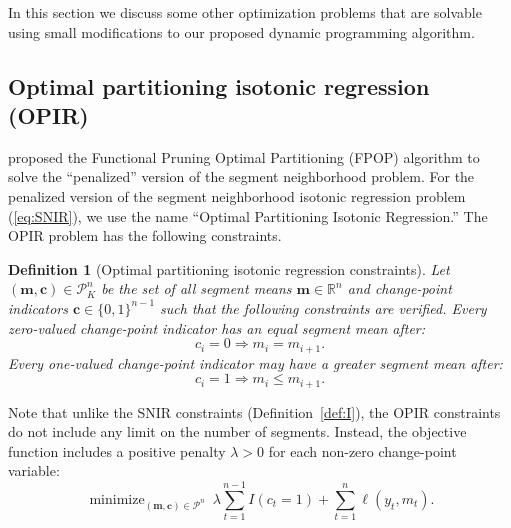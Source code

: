 \documentclass{article}
\newtheorem{definition}{Definition}
\DeclareMathOperator*{\minimize}{minimize}
\newcommand{\RR}{\mathbb R}
\begin{document}
In this section we discuss some other optimization problems that are
solvable using small modifications to our proposed dynamic programming
algorithm.



\subsection{Optimal partitioning isotonic regression (OPIR)}


\citet{FPOP} proposed the Functional Pruning Optimal Partitioning
(FPOP) algorithm to solve the ``penalized'' version of the segment
neighborhood problem. For the penalized version of the segment
neighborhood isotonic regression problem (\ref{eq:SNIR}), we use the
name ``Optimal Partitioning Isotonic Regression.'' The OPIR problem has
the following constraints.
\begin{definition}[Optimal partitioning isotonic regression constraints]
  \label{def:P}
  Let $(\mathbf m, \mathbf c)\in\mathcal P_K^n$ be the set of all segment means
  $\mathbf m\in\RR^n$ and change-point indicators
  $\mathbf c\in\{0,1\}^{n-1}$ such that the following constraints are
  verified. 
  Every zero-valued change-point indicator has an equal segment mean
  after:
  \begin{equation}
    \label{eq:P_0}
    c_i = 0 \Rightarrow m_i = m_{i+1}.
  \end{equation}
  Every one-valued change-point indicator may have a greater segment
  mean after:
  \begin{equation}
    \label{eq:P_1}
    c_i = 1 \Rightarrow m_i \leq m_{i+1}.
  \end{equation}
\end{definition}
Note that unlike the SNIR constraints (Definition~\ref{def:I}), the
OPIR constraints do not include any limit on the number of
segments. Instead, the objective function includes a positive penalty
$\lambda>0$ for each non-zero change-point variable:
\begin{equation}
    \minimize_{
        (\mathbf m, \mathbf c)\in\mathcal P^n
      } \ 
\lambda\sum_{t=1}^{n-1} I(c_t =1)
+
\sum_{t=1}^n \ell(y_t, m_t).
\end{equation}
\end{document}
